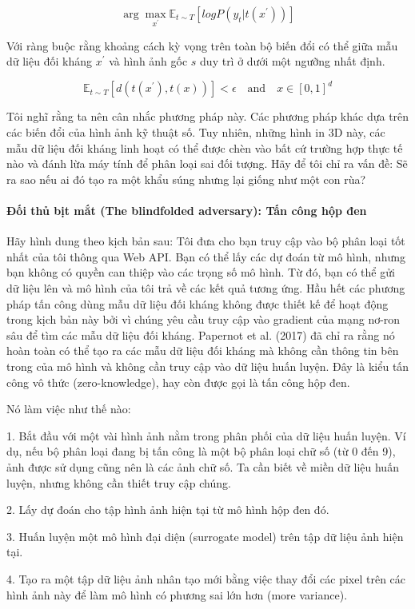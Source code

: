 \[\arg\max_{x^\prime}\mathbb{E}_{t\sim{}T}[log{}P(y_t|t(x^\prime))]\]

Với ràng buộc rằng khoảng cách kỳ vọng trên toàn bộ biến đổi có thể giữa mẫu dữ liệu đối kháng $x^\prime$ và hình ảnh gốc $s$ duy trì ở dưới một ngưỡng nhất định. 

 \[\mathbb{E}_{t\sim{}T}[d(t(x^\prime),t(x))]<\epsilon\quad\text{and}\quad{}x\in[0,1]^d\]

Tôi nghĩ rằng ta nên cân nhắc phương pháp này. Các phương pháp khác dựa trên các biến đổi của hình ảnh kỹ thuật số. Tuy nhiên, những hình in 3D này, các mẫu dữ liệu đối kháng linh hoạt có thể được chèn vào bất cứ trường hợp thực tế nào và đánh lừa máy tính để phân loại sai đối tượng. Hãy để tôi chỉ ra vấn đề: Sẽ ra sao nếu ai đó tạo ra một khẩu súng nhưng lại giống như một con rùa?

\paragraph{Đối thủ bịt mắt (The blindfolded adversary): Tấn công hộp đen}

Hãy hình dung theo kịch bản sau: Tôi đưa cho bạn truy cập vào bộ phân loại tốt nhất của tôi thông qua Web API. Bạn có thể lấy các dự đoán từ mô hình, nhưng bạn không có quyền can thiệp vào các trọng số mô hình. Từ đó, bạn có thể gửi dữ liệu lên và mô hình của tôi trả về các kết quả tương ứng. Hầu hết các phương pháp tấn công dùng mẫu dữ liệu đối kháng không được thiết kế để hoạt động trong kịch bản này bởi vì chúng yêu cầu truy cập vào gradient của mạng nơ-ron sâu để tìm các mẫu dữ liệu đối kháng. Papernot et al. (2017) đã chỉ ra rằng nó hoàn toàn có thể tạo ra các mẫu dữ liệu đối kháng mà không cần thông tin bên trong của mô hình và không cần truy cập vào dữ liệu huấn luyện. Đây là kiểu tấn công vô thức (zero-knowledge), hay còn được gọi là tấn công hộp đen.

Nó làm việc như thế nào:

1. Bắt đầu với một vài hình ảnh nằm trong phân phối của dữ liệu huấn luyện. Ví dụ, nếu bộ phân loại đang bị tấn công là một bộ phân loại chữ số (từ 0 đến 9), ảnh được sử dụng cũng nên là các ảnh chữ số. Ta cần biết về miền dữ liệu huấn luyện, nhưng không cần thiết truy cập chúng.

2. Lấy dự đoán cho tập hình ảnh hiện tại từ mô hình hộp đen đó.

3. Huấn luyện một mô hình đại diện (surrogate model) trên tập dữ liệu ảnh hiện tại.

4. Tạo ra một tập dữ liệu ảnh nhân tạo mới bằng việc thay đổi các pixel trên các hình ảnh này để làm mô hình có phương sai lớn hơn (more variance).

